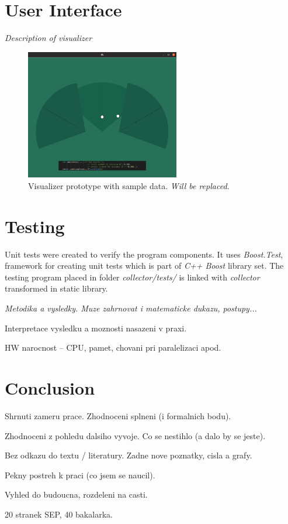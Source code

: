 \chapter{User Interface}
\label{Label:UI}

{\it Description of visualizer}

\begin{figure}[h!]
\begin{center}
\includegraphics[width=0.6\textwidth]{obrazky-figures/visualizer.png}
\caption{Visualizer prototype with sample data. {\it Will be replaced.} \label{fig:visualizer}}
\end{center}
\end{figure}


\chapter{Testing}
Unit tests were created to verify the program components. It uses {\it Boost.Test},
framework for creating unit tests which is part of {\it C++ Boost} library set.
The testing program placed in folder {\it collector/tests/} is linked with
{\it collector} transformed in static library.

{\it
Metodika a vysledky. Muze zahrnovat i matematicke dukazu, postupy...

Interpretace vysledku a moznosti nasazeni v praxi.

HW narocnost -- CPU, pamet, chovani pri paralelizaci apod.
}



\chapter{Conclusion}
Shrnuti zameru prace. Zhodnoceni splneni (i formalnich bodu).

Zhodnoceni z pohledu dalsiho vyvoje. Co se nestihlo (a dalo by se jeste).

Bez odkazu do textu / literatury. Zadne nove poznatky, cisla a grafy.

Pekny postreh k praci (co jsem se naucil).

Vyhled do budoucna, rozdeleni na casti.

20 stranek SEP, 40 bakalarka.




